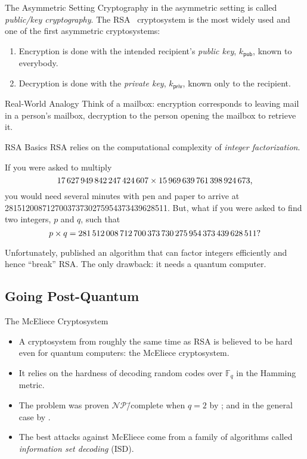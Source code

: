 \documentclass[usepdftitle=false]{beamer}
\newcommand*{\pub}{\ensuremath{\mathsf{pub}}}%
\newcommand*{\priv}{\ensuremath{\mathsf{priv}}}%
\newcommand*{\FF}{\ensuremath{\mathbb{F}}}%
\newcommand*{\NP}{\ensuremath{\mathcal{NP}}}%
\begin{document}
\begin{frame}{The Asymmetric Setting}
  Cryptography in the asymmetric setting is called \emph{public\-/key
    cryptography}.  The RSA~\autocite{RSA78} cryptosystem is the most
  widely used and one of the first asymmetric cryptosystems:
  \begin{enumerate}
  \item Encryption is done with the intended recipient's \emph{public
      key}, \(k_{\pub}\), known to everybody.
  \item Decryption is done with the \emph{private key}, \(k_{\priv}\),
    known only to the recipient.
  \end{enumerate}
  \begin{block}{Real-World Analogy}
    Think of a mailbox: encryption corresponds to leaving mail in a
    person's mailbox, decryption to the person opening the mailbox to
    retrieve it.
  \end{block}
\end{frame}

\begin{frame}{RSA Basics}
  RSA relies on the computational complexity of \emph{integer
    factorization}.
  \begin{example}
    If you were asked to multiply
    \[
      \num{17627949842247424607} \times \num{15969639761398924673}\text,
    \]
    you would need several minutes with pen and paper to arrive at
    \num{281512008712700373730275954373439628511}.  But, what if you
    were asked to find two integers, \(p\) and \(q\), such that
    \[
      p \times q = \num{281512008712700373730275954373439628511}\text?
    \]
  \end{example}
  Unfortunately, \textcite{Sho97} published an algorithm that can
  factor integers efficiently and hence \enquote{break} RSA\@.  The
  only drawback: it needs a \alert{quantum computer}.
\end{frame}

\subsection{Going Post-Quantum}

\begin{frame}{The McEliece Cryptosystem}
  \begin{itemize}
  \item A cryptosystem from roughly the same time as RSA is believed
    to be hard even for quantum computers: the McEliece cryptosystem.
  \item It relies on the hardness of decoding random codes over
    \(\FF_q\) in the Hamming metric.
  \item The problem was proven \(\NP\)\=/complete when \(q = 2\) by
    \textcite{BEvT78}; and in the general case by \textcite{Bar94}.
  \item The best attacks against McEliece come from a family of
    algorithms called \emph{information set decoding} (ISD).
  \end{itemize}
\end{frame}
\end{document}
